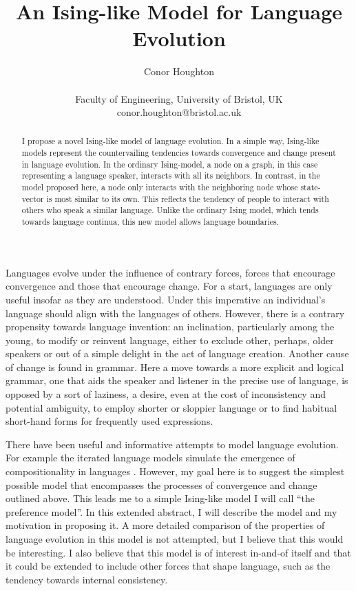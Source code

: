 \documentclass[letterpaper]{article}
\title{An Ising-like Model for Language Evolution}
\author{Conor Houghton \\
\mbox{}\\
Faculty of Engineering, University of Bristol, UK\\
conor.houghton@bristol.ac.uk} %
\begin{document}
\maketitle

\begin{abstract}
I propose a novel Ising-like model of language evolution. In a simple way, Ising-like models represent the countervailing tendencies towards convergence and change present in language evolution. In the ordinary Ising-model, a node on a graph, in this case representing a language speaker, interacts with all its neighbors. In contrast, in the model proposed here, a node only interacts with the neighboring node whose state-vector is most similar to its own. This reflects the tendency of people to interact with others who speak a similar language. Unlike the ordinary Ising model, which tends towards language continua, this new model allows language boundaries. 
\end{abstract}

Languages evolve under the influence of contrary forces, forces that encourage convergence and those that encourage change. For a start, languages are only useful insofar as they are understood. Under this imperative an individual's language should align with the languages of others. However, there is a contrary propensity towards language invention: an inclination, particularly among the young, to modify or reinvent language, either to exclude other, perhaps, older speakers or out of a simple delight in the act of language creation. Another cause of change is found in grammar. Here a move towards a more explicit and logical grammar, one that aids the speaker and listener in the precise use of language, is opposed by a sort of laziness, a desire, even at the cost of inconsistency and potential ambiguity, to employ shorter or sloppier language or to find habitual short-hand forms for frequently used expressions. 

There have been useful and informative attempts to model language evolution. For example the iterated language models simulate the emergence of compositionality in languages \citep{KirbyHurford2002,SainsHoughtonBullock2023}. However, my goal here is to suggest the simplest possible model that encompasses the processes of convergence and change outlined above. This leads me to a simple Ising-like model I will call ``the preference model''. In this extended abstract, I will describe the model and my motivation in proposing it. A more detailed comparison of the properties of language evolution in this model is not attempted, but I believe that this would be interesting. I also believe that this model is of interest in-and-of itself and that it could be extended to include other forces that shape language, such as the tendency towards internal consistency.
\end{document}
